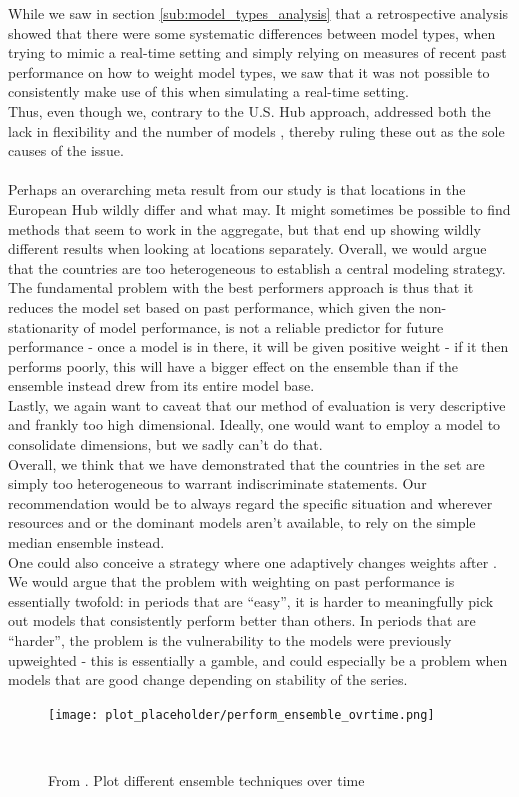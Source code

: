 While we saw in section \ref{sub:model_types_analysis} that a retrospective analysis showed that there were some systematic differences between model types, when trying to mimic a real-time setting and simply relying on measures of recent past performance on how to weight model types, we saw that it was not possible to consistently make use of this when simulating a real-time setting.  \\
Thus, even though we, contrary to the U.S. Hub approach, addressed both the lack in flexibility and the number of models , thereby ruling these out as the sole causes of the issue.\\\\
Perhaps an overarching meta result from our study is that locations in the European Hub wildly differ and what may. It might sometimes be possible to find methods that seem to work in the aggregate, but that end up showing wildly different results when looking at locations separately. Overall, we would argue that the countries are too heterogeneous to establish a central modeling strategy.\\
The fundamental problem with the best performers approach is thus that it reduces the model set based on past performance, which given the non-stationarity of model performance, is not a reliable predictor for future performance - once a model is in there, it will be given positive weight - if it then performs poorly, this will have a bigger effect on the ensemble than if the ensemble instead drew from its entire model base.\\
Lastly, we again want to caveat that our method of evaluation is very descriptive and frankly too high dimensional. Ideally, one would want to employ a model to consolidate dimensions, but we sadly can't do that. \\
Overall, we think that we have demonstrated that the countries in the set are simply too heterogeneous to warrant indiscriminate statements. Our recommendation would be to always regard the specific situation and wherever resources and or the dominant models aren't available, to rely on the simple median ensemble instead.\\
One could also conceive a strategy where one adaptively changes weights after .\\
We would argue that the problem with weighting on past performance is essentially twofold: in periods that are ``easy'', it is harder to meaningfully pick out models that consistently perform better than others. In periods that are ``harder'', the problem is the vulnerability to the models were previously upweighted - this is essentially a gamble, and could especially be a problem when models that are good change depending on stability of the series.
\begin{figure}
\centering
\texttt{[image: plot\_placeholder/perform\_ensemble\_ovrtime.png]}
\caption{From \cite{ray_ensemble_2020}. Plot different ensemble techniques over time}
\
\end{figure}



